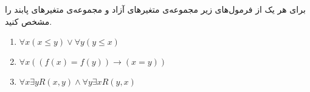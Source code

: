 برای هر یک از فرمول‌های زیر مجموعه‌ی متغیرهای آزاد و مجموعه‌ی متغیرهای پابند را مشخص کنید.
\begin{enumerate}[label=(\alph*)]
  \item $\forall x (x \leq y) \vee \forall y (y \leq x)$
  \item $\forall x ((f(x) = f(y)) \rightarrow (x = y))$
  \item $\forall x \exists y R(x, y) \wedge \forall y \exists x R(y, x)$
\end{enumerate}